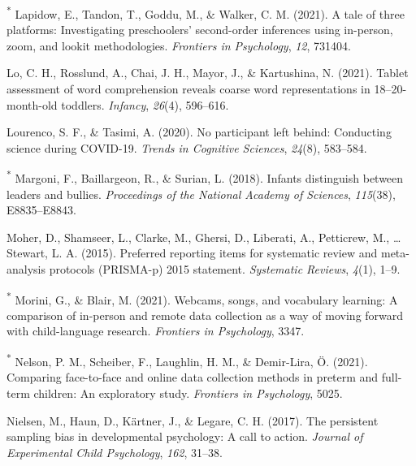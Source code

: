 \documentclass[
  man,floatsintext]{apa6}
\newlength{\cslhangindent}
\newlength{\cslentryspacingunit} %
\newenvironment{CSLReferences}[2] %
 {%
  \setlength{\parindent}{0pt}
  \ifodd #1
  \let\oldpar\par
  \def\par{\hangindent=\cslhangindent\oldpar}
  \fi
  \setlength{\parskip}{#2\cslentryspacingunit}
 }%
 {}
\begin{document}
\begin{CSLReferences}{1}{0}
\leavevmode{}%
\textsuperscript{*} Lapidow, E., Tandon, T., Goddu, M., \& Walker, C. M. (2021). A tale of three platforms: Investigating preschoolers' second-order inferences using in-person, zoom, and lookit methodologies. \emph{Frontiers in Psychology}, \emph{12}, 731404.

\leavevmode{}%
Lo, C. H., Rosslund, A., Chai, J. H., Mayor, J., \& Kartushina, N. (2021). Tablet assessment of word comprehension reveals coarse word representations in 18--20-month-old toddlers. \emph{Infancy}, \emph{26}(4), 596--616.

\leavevmode{}%
Lourenco, S. F., \& Tasimi, A. (2020). No participant left behind: Conducting science during COVID-19. \emph{Trends in Cognitive Sciences}, \emph{24}(8), 583--584.

\leavevmode{}%
\textsuperscript{*} Margoni, F., Baillargeon, R., \& Surian, L. (2018). Infants distinguish between leaders and bullies. \emph{Proceedings of the National Academy of Sciences}, \emph{115}(38), E8835--E8843.

\leavevmode{}%
Moher, D., Shamseer, L., Clarke, M., Ghersi, D., Liberati, A., Petticrew, M., \ldots{} Stewart, L. A. (2015). Preferred reporting items for systematic review and meta-analysis protocols (PRISMA-p) 2015 statement. \emph{Systematic Reviews}, \emph{4}(1), 1--9.

\leavevmode{}%
\textsuperscript{*} Morini, G., \& Blair, M. (2021). Webcams, songs, and vocabulary learning: A comparison of in-person and remote data collection as a way of moving forward with child-language research. \emph{Frontiers in Psychology}, 3347.

\leavevmode{}%
\textsuperscript{*} Nelson, P. M., Scheiber, F., Laughlin, H. M., \& Demir-Lira, Ö. (2021). Comparing face-to-face and online data collection methods in preterm and full-term children: An exploratory study. \emph{Frontiers in Psychology}, 5025.

\leavevmode{}%
Nielsen, M., Haun, D., Kärtner, J., \& Legare, C. H. (2017). The persistent sampling bias in developmental psychology: A call to action. \emph{Journal of Experimental Child Psychology}, \emph{162}, 31--38.


\end{CSLReferences}
\end{document}
